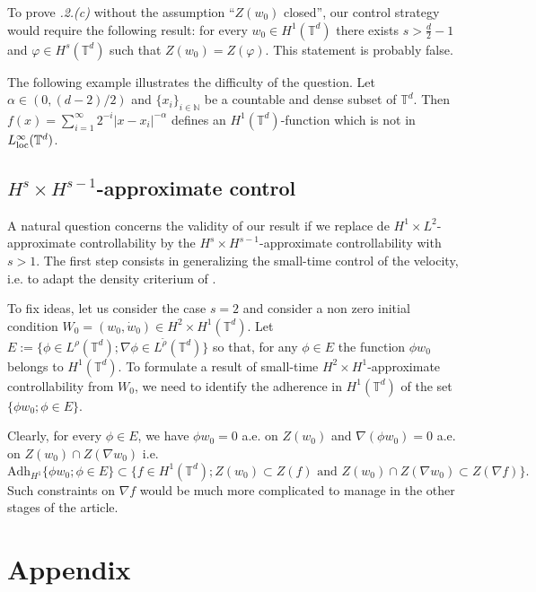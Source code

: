 \documentclass[a4paper]{article}
\theoremstyle{plain}
\newcommand{\T}{\mathbb{T}}
\begin{document}
To prove \emph{.2.(c)} without the assumption ``$Z(w_0)$ closed'', our control strategy would require the following result: for every $w_0 \in H^1(\T^d)$ there exists $s>\frac{d}{2}-1$ and $\varphi \in H^s(\T^d)$ such that $Z(w_0)=Z(\varphi)$. This statement is probably false.


The following example illustrates the difficulty of the question.
Let $\alpha\in(0, (d-2)/2)$ and $\{x_i\}_{i\in \mathbb{N}}$ be a countable and dense subset of $\T^d$. Then $f(x)=\sum_{i=1}^\infty 2^{-i}|x-x_i|^{-\alpha}$ defines an $H^1(\T^d)$-function which is not in $L^\infty_{\rm loc}(\T^d)$.



\subsection{$H^s \times H^{s-1}$-approximate control}

A natural question concerns the validity of our result if we replace de $H^1 \times L^2$-approximate controllability by the $H^s \times H^{s-1}$-approximate controllability with $s>1$. 
The first step consists in generalizing the small-time control of the velocity, i.e. to adapt the density criterium of . 

To fix ideas, let us consider the case $s=2$ and consider a non zero initial condition $W_0=(w_0,\dot{w}_0) \in H^2 \times H^1(\T^d)$.
Let $E:=\{\phi \in L^{\rho}(\T^d);\nabla \phi \in L^{\widetilde{\rho}}(\T^d)\}$ so that, for any $\phi \in E$ the function $\phi w_0$ belongs to $H^1(\T^d)$. To formulate a result of small-time $H^2 \times H^1$-approximate controllability from $W_0$, we need to identify the adherence in $H^1(\T^d)$ of the set $\{ \phi w_0 ; \phi \in E \}$.

Clearly, for every $\phi \in E$, we have
$\phi w_0=0$ a.e. on $Z(w_0)$ and $\nabla (\phi w_0) =0$ a.e. on $Z(w_0) \cap Z(\nabla w_0)$ i.e.
$$\text{Adh}_{H^1} \{ \phi w_0 ; \phi \in E \}  \subset
\{ f \in H^1 (\T^d) ; 
Z(w_0) \subset Z(f) \text{ and }
Z(w_0) \cap Z(\nabla w_0) \subset Z(\nabla f)
  \}.$$
Such constraints on $\nabla f$ would be much more complicated to manage in the other stages of the article.



\appendix
\section{Appendix}
\end{document}
